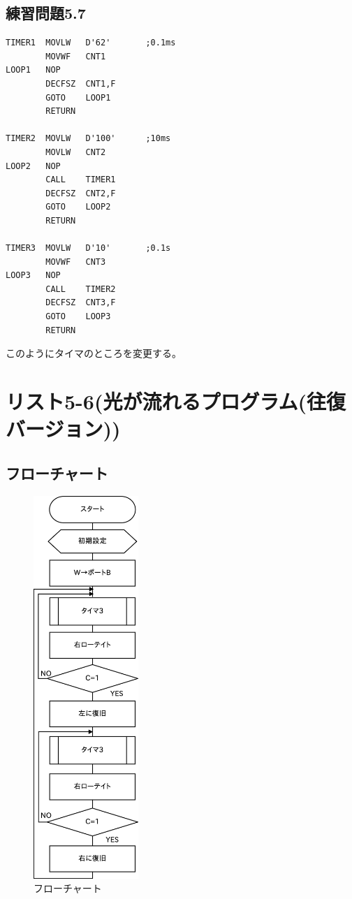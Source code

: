 \documentclass[a4paper,12pt]{ujarticle}
\begin{document}
  \subsection{練習問題5.7}
  \begin{lstlisting}[basicstyle=\ttfamily\footnotesize, frame=single]
TIMER1  MOVLW   D'62'       ;0.1ms
        MOVWF   CNT1
LOOP1   NOP
        DECFSZ  CNT1,F
        GOTO    LOOP1
        RETURN

TIMER2  MOVLW   D'100'      ;10ms
        MOVLW   CNT2
LOOP2   NOP
        CALL    TIMER1
        DECFSZ  CNT2,F
        GOTO    LOOP2
        RETURN

TIMER3  MOVLW   D'10'       ;0.1s
        MOVWF   CNT3
LOOP3   NOP
        CALL    TIMER2
        DECFSZ  CNT3,F
        GOTO    LOOP3
        RETURN
  \end{lstlisting}
  このようにタイマのところを変更する。
  \clearpage
 \section{リスト5-6(光が流れるプログラム(往復バージョン))}
  \subsection{フローチャート}
  \begin{figure}[htbp]
   \begin{center}
    \includegraphics[height=145mm]{Diagram5-6.eps}
   \end{center}
   \caption{フローチャート}
   \label{fig}
  \end{figure}
\end{document}
